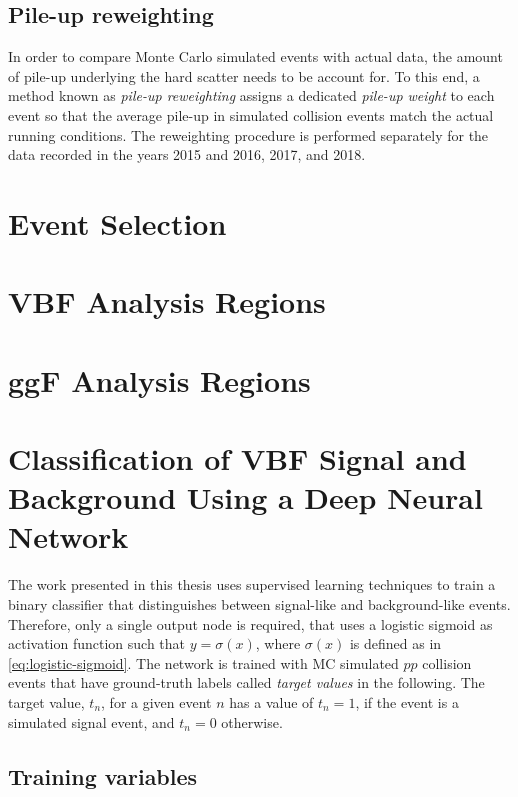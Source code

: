 \subsection{Pile-up reweighting}
In order to compare Monte Carlo simulated events with actual data, the amount of pile-up underlying the hard scatter needs to be account for.
To this end, a method known as \emph{pile-up reweighting} assigns a dedicated \emph{pile-up weight} to each event so that the average pile-up in simulated collision events match the actual running conditions. The reweighting procedure is performed separately for the data recorded in the years 2015 and 2016, 2017, and 2018.



\section{Event Selection}
\section{VBF Analysis Regions}
\section{ggF Analysis Regions}

\section{Classification of VBF Signal and Background Using a Deep Neural Network}

The work presented in this thesis uses supervised learning techniques to train a binary classifier that distinguishes between signal-like and background-like events. 
Therefore, only a single output node is required, that uses a logistic sigmoid as activation function such that $y = \sigma(x)$, where $\sigma(x)$ is defined as in \cref{eq:logistic-sigmoid}.
The network is trained with MC simulated $pp$ collision events that have ground-truth labels called \emph{target values} in the following. The target value, $t_n$, for a given event $n$ has a value of $t_n = 1$, if the event is a simulated signal event, and $t_n = 0$ otherwise.

\subsection{Training variables}
